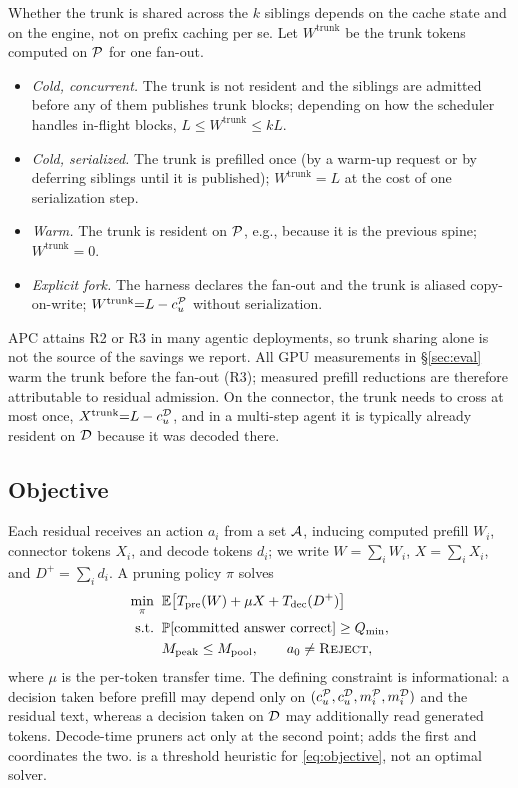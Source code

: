 Whether the trunk is shared across the $k$ siblings depends on the cache state and on the engine, not on prefix caching per se.
Let $W^{\mathrm{trunk}}$ be the trunk tokens computed on $\mathcal{P}$ for one fan-out.
\begin{itemize}[leftmargin=*,itemsep=1pt,topsep=2pt]
\item[\textbf{R1}] \emph{Cold, concurrent.} The trunk is not resident and the siblings are admitted before any of them publishes trunk blocks; depending on how the scheduler handles in-flight blocks, $L\le W^{\mathrm{trunk}}\le kL$.
\item[\textbf{R2}] \emph{Cold, serialized.} The trunk is prefilled once (by a warm-up request or by deferring siblings until it is published); $W^{\mathrm{trunk}}{=}L$ at the cost of one serialization step.
\item[\textbf{R3}] \emph{Warm.} The trunk is resident on $\mathcal{P}$, e.g., because it is the previous spine; $W^{\mathrm{trunk}}{=}0$.
\item[\textbf{R4}] \emph{Explicit fork.} The harness declares the fan-out and the trunk is aliased copy-on-write; $W^{\mathrm{trunk}}{=}L-c_u^{\mathcal{P}}$ without serialization.
\end{itemize}
APC attains R2 or R3 in many agentic deployments, so trunk sharing alone is not the source of the savings we report.
All GPU measurements in \S\ref{sec:eval} warm the trunk before the fan-out (R3); measured prefill reductions are therefore attributable to residual admission.
On the connector, the trunk needs to cross at most once, $X^{\mathrm{trunk}}{=}L-c_u^{\mathcal{D}}$, and in a multi-step agent it is typically already resident on $\mathcal{D}$ because it was decoded there.

\subsection{Objective}
\label{sec:objective}

Each residual receives an action $a_i$ from a set $\mathcal{A}$, inducing computed prefill $W_i$, connector tokens $X_i$, and decode tokens $d_i$; we write $W{=}\sum_iW_i$, $X{=}\sum_iX_i$, and $D^{+}{=}\sum_id_i$.
A pruning policy $\pi$ solves
\begin{equation}
\label{eq:objective}
\begin{aligned}
\min_{\pi}\;\; & \mathbb{E}\bigl[T_{\mathrm{pre}}(W)+\mu X+T_{\mathrm{dec}}(D^{+})\bigr]\\
\text{s.t.}\;\; & \mathbb{P}[\text{committed answer correct}]\ge Q_{\min},\\
& M_{\mathrm{peak}}\le M_{\mathrm{pool}},\qquad a_0\neq\textsc{Reject},
\end{aligned}
\end{equation}
where $\mu$ is the per-token transfer time.
The defining constraint is informational: a decision taken before prefill may depend only on $(c_u^{\mathcal{P}},c_u^{\mathcal{D}},m_i^{\mathcal{P}},m_i^{\mathcal{D}})$ and the residual text, whereas a decision taken on $\mathcal{D}$ may additionally read generated tokens.
Decode-time pruners act only at the second point; \sys adds the first and coordinates the two.
\sys is a threshold heuristic for \eqref{eq:objective}, not an optimal solver.
